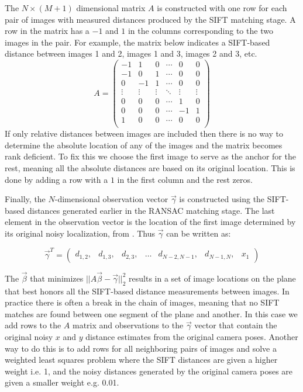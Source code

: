 \documentclass[10pt,twocolumn,letterpaper]{article}
\begin{document}
The $N \times (M+1)$ dimensional matrix $A$ is constructed with one
row for each pair of images with measured distances produced by the
SIFT matching stage. A row in the matrix has a $-1$ and $1$ in the
columns corresponding to the two images in the pair. For example, the
matrix below indicates a SIFT-based distance between images 1 and 2,
images 1 and 3, images 2 and 3, etc.
\[
A =
\begin{pmatrix}
  -1 & 1 & 0 & \cdots & 0 & 0\\
  -1 & 0 & 1 & \cdots & 0 & 0\\
  0 & -1 & 1 & \cdots & 0 & 0\\
  \vdots  & \vdots & \vdots & \ddots & \vdots  & \vdots\\
  0 & 0 & 0 & \cdots & 1 & 0 \\
  0 & 0 & 0 & \cdots & -1 & 1 \\
  1 & 0 & 0 & \cdots & 0 & 0 \\
\end{pmatrix}
\]
If only relative distances between images are included then there is
no way to determine the absolute location of any of the images and the
matrix becomes rank deficient. To fix this we choose the first image
to serve as the anchor for the rest, meaning all the absolute
distances are based on its original location. This is done by adding a
row with a $1$ in the first column and the rest zeros.

Finally, the $N$-dimensional observation vector $\vec{\gamma}$ is
constructed using the SIFT-based distances generated earlier in the
RANSAC matching stage. The last element in the observation vector is
the location of the first image determined by its original noisy
localization, from \cite{chen2010indoor, liu2010indoor}. Thus
$\vec{\gamma}$ can be written as:

\[
\vec{\gamma}^T =
\begin{pmatrix}
  d_{1,2}, &d_{1,3}, &d_{2,3}, &\hdots &d_{N-2,N-1}, &d_{N-1,N}, &x_1
\end{pmatrix}
\]

The $\vec{\beta}$ that minimizes $||A \vec{\beta} -
\vec{\gamma}||_2^2$ results in a set of image locations on the plane
that best honors all the SIFT-based distance measurements between
images. In practice there is often a break in the chain of images,
meaning that no SIFT matches are found between one segment of the
plane and another. In this case we add rows to the $A$ matrix and
observations to the $\vec{\gamma}$ vector that contain the original
noisy $x$ and $y$ distance estimates from the original camera
poses. Another way to do this is to add rows for all neighboring pairs
of images and solve a weighted least squares problem where the SIFT
distances are given a higher weight i.e. 1, and the noisy distances
generated by the original camera poses \cite{chen2010indoor,
  liu2010indoor} are given a smaller weight e.g. 0.01.
\end{document}
